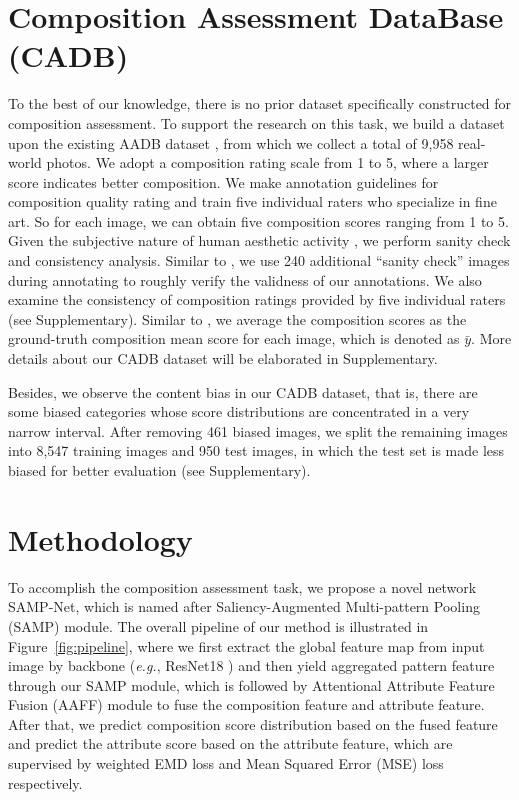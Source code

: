\documentclass{bmvc2k}
\begin{document}
\section{Composition Assessment DataBase (CADB)}
\label{sec:dataset}
To the best of our knowledge, there is no prior dataset specifically constructed for composition assessment. To support the research on this task, we build a dataset upon the existing AADB dataset \cite{Kong2016PhotoAR}, from which we collect a total of 9,958 real-world photos. We adopt a composition rating scale from 1 to 5, where a larger score indicates better composition.  We make annotation guidelines for composition quality rating and train five individual raters who specialize in fine art.  So for each image, we can obtain five composition scores ranging from 1 to 5.
Given the subjective nature of human aesthetic activity \cite{savakis2000evaluation,Prakel2010TheFO,Freeman2007ThePE}, we perform sanity check and consistency analysis. Similar to \cite{Yu2018LearningTD}, we use 240 additional ``sanity check'' images during annotating to roughly verify the validness of our annotations. We also examine the consistency of composition ratings provided by five individual raters  (see Supplementary).  Similar to \cite{Murray2012AVAAL, Kong2016PhotoAR}, we average the composition scores as the ground-truth composition mean score for each image, which is denoted as $\bar{y}$. More details about our CADB dataset will be elaborated in Supplementary. 

 Besides, we observe the content bias in our CADB dataset, that is, there are some biased categories whose score distributions are concentrated in a very narrow interval. After removing 461 biased images, we split the remaining images into 8,547 training images and 950 test images, in which the test set is made less biased for better evaluation (see Supplementary).
 












\section{Methodology}
\label{sec:methodology}
To accomplish the composition assessment task, we propose a novel network SAMP-Net, which is named after Saliency-Augmented Multi-pattern Pooling (SAMP) module. The overall pipeline of our method is illustrated in Figure~\ref{fig:pipeline}, where we first extract the global feature map from input image by backbone (\emph{e.g.}, ResNet18 \cite{he2016deep}) and then yield aggregated pattern feature through our SAMP module, which is followed by Attentional Attribute Feature Fusion (AAFF) module to fuse the composition feature and attribute feature. After that, we predict composition score distribution based on the fused feature and predict the attribute score based on the attribute feature, which are supervised by weighted EMD loss and Mean Squared Error (MSE) loss respectively.
\end{document}

